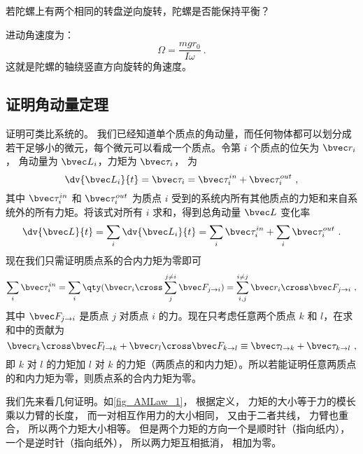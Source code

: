 \begin{exercise}{}
若陀螺上有两个相同的转盘逆向旋转，陀螺是否能保持平衡？
\end{exercise}

进动角速度为：
\begin{equation}\label{eq_AMLaw_2}
\Omega = \frac{mgr_0}{I\omega}~.
\end{equation}
这就是陀螺的轴绕竖直方向旋转的角速度。


\subsection{证明角动量定理}
证明可类比系统的。 我们已经知道单个质点的角动量，而任何物体都可以划分成若干足够小的微元，每个微元可以看成一个质点。令第 $i$ 个质点的位矢为 $\bvec r_i$， 角动量为 $\bvec L_i$，力矩为 $\bvec \tau_i$， 为
\begin{equation}
\dv{\bvec L_i}{t} = \bvec \tau_i = \bvec \tau_i^{in} + \bvec \tau_i^{out}~,
\end{equation}
其中 $\bvec \tau_i^{in}$ 和 $\bvec \tau_i^{out}$ 为质点 $i$ 受到的系统内所有其他质点的力矩和来自系统外的所有力矩。将该式对所有 $i$ 求和，得到总角动量 $\bvec L$ 变化率
\begin{equation}
\dv{\bvec L}{t} =\sum_i\dv{\bvec L_i}{t} = \sum_i\bvec \tau_i^{in} + \sum_i\bvec \tau_i^{out}~.
\end{equation}
现在我们只需证明质点系的合内力矩为零即可
\begin{equation}
\sum_i\bvec \tau_i^{in} = \sum_i \qty(\bvec r_i\cross\sum_j^{j\ne i}\bvec F_{j\to i}) = \sum_{i,j}^{i\ne j} \bvec r_i\cross\bvec F_{j\to i}~,
\end{equation}
其中 $\bvec F_{j\to i}$ 是质点 $j$ 对质点 $i$ 的力。现在只考虑任意两个质点 $k$ 和 $l$，在求和中的贡献为
\begin{equation}
\bvec r_k\cross\bvec F_{l\to k} + \bvec r_l\cross\bvec F_{k\to l} \equiv \bvec \tau_{l\to k}+ \bvec \tau_{k\to l}~,
\end{equation}
即 $k$ 对 $l$ 的力矩加 $l$ 对 $k$ 的力矩（两质点的和内力矩）。所以若能证明任意两质点的和内力矩为零，则质点系的合内力矩为零。

我们先来看几何证明。如\autoref{fig_AMLaw_1}， 根据定义， 力矩的大小等于力的模长乘以力臂的长度， 而一对相互作用力的大小相同， 又由于二者共线， 力臂也重合， 所以两个力矩大小相等。 但是两个力矩的方向一个是顺时针（指向纸内）， 一个是逆时针（指向纸外）， 所以两力矩互相抵消， 相加为零。

